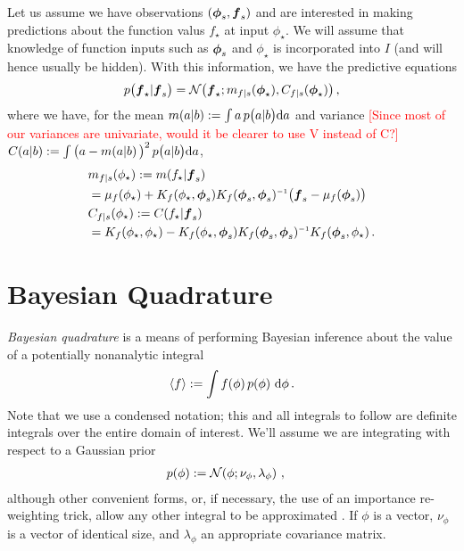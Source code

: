 \documentclass{article}
\renewcommand{\pskinny}[2]{p\big(#1|#2\big)}
\begin{document}
Let us assume we have observations $(\vph_s,\vf_s)$ and
are interested in making predictions about the function
valus $f_\star$ at input $\phi_\star$. We will assume that knowledge of function inputs such as
$\vph_s$ and $\phi_\star$ is incorporated into $I$ (and will hence usually be hidden). With
this information, we have the predictive equations
$$
\pskinny{\vf_\star}{\vf_s} = 
\bN{\vf_\star}
{\meancond{f}{\vph_\star}{s}}
{\covcond{f}{\vph_\star}{s}}\,,
$$
where we have, for the mean $\novmean{a}{b}\deq \int a\,\pskinny{a}{b} \ud
a$ and variance \textcolor{red}{[Since most of our variances are univariate, would it be clearer to use V instead of C?]}$\novcov{a}{b}\deq \int
\big(a-\novmean{a}{b}\big)^2\,\pskinny{a}{b} \ud a$,
\begin{align} 
\textstyle
&\meancond{f}{\phi_\star}{s}
\deq \mean{f_\star}{\vf_s}
\nonumber\\
&= \mu_{f}(\phi_\star) + 
K_{f}(\phi_\star,\vph_s)
K_{f}(\vph_s,\vph_s)\inv
\bigl(\vf_s-{\mu}_{f}(\vph_s)\bigr) \label{eq:GPMean}
\\
&\covcond{f}{\phi_\star}{s}
\deq {\cov{f_\star}{\vf_s}} 
\nonumber\\
&= K_{f}(\phi_\star,\phi_\star) - 
K_{f}(\phi_\star,\vph_s)
K_{f}(\vph_s,\vph_s)\inv
K_{f}(\vph_s,\phi_\star)\,. \nonumber%
\end{align} 

\section{Bayesian Quadrature} \label{sec:BQ}


\emph{Bayesian quadrature} \citep{BZHermiteQuadrature,BZMonteCarlo} is a means of
performing Bayesian inference about the value of a potentially
nonanalytic integral 
\begin{equation} \label{eq:intyf}
 \inty{f} \deq \int f(\phi)\,\po{\phi}\,\ud\phi\,.
\end{equation}
Note that we use a condensed notation; this and all integrals to follow are definite integrals over the entire domain of interest.
We'll assume we are integrating with respect to a Gaussian
prior
\begin{align}\label{eq:phiprior}
\textstyle
 \po{\phi} & \deq \N{\phi}{\nu_{\phi}}{\lambda_{\phi}} \,,
\end{align}
although other convenient forms, or, if necessary, the use of an
importance re-weighting trick, allow any other integral to be
approximated \citep{OsborneAnon}. If $\phi$ is a vector, $\nu_{\phi}$ is a  vector of identical size, and $\lambda_{\phi}$ an appropriate covariance matrix.
\end{document}
